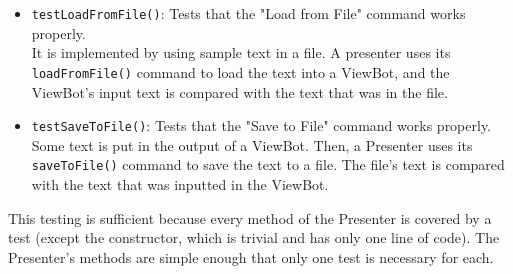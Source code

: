 \documentclass[11pt]{article}
\begin{document}
\begin{itemize}
\item \texttt{testLoadFromFile()}: Tests that the "Load from File" command works properly.\\
It is implemented by using sample text in a file.  A presenter uses its \texttt{loadFromFile()} command to load the text into a ViewBot, and the ViewBot's input text is compared with the text that was in the file.\\
\item \texttt{testSaveToFile()}: Tests that the "Save to File" command works properly.\\
Some text is put in the output of a ViewBot.  Then, a Presenter uses its \texttt{saveToFile()} command to save the text to a file.  The file's text is compared with the text that was inputted in the ViewBot.\\
\end{itemize}

This testing is sufficient because every method of the Presenter is covered by a test (except the constructor, which is trivial and has only one line of code).  The Presenter's methods are simple enough that only one test is necessary for each.\\
\end{document}

